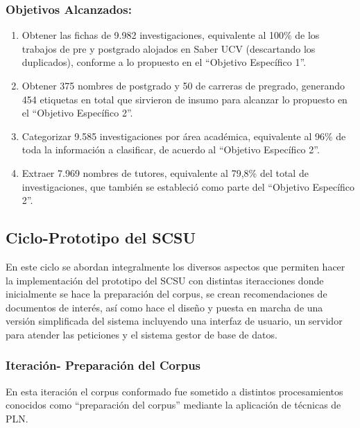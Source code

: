 \documentclass[
  12pt,
  openany]{book}
\begin{document}
\hypertarget{objetivos-alcanzados}{%
\subsubsection{Objetivos Alcanzados:}\label{objetivos-alcanzados}}

\begin{enumerate}
\def\labelenumi{\arabic{enumi}.}
\item
  Obtener las fichas de 9.982 investigaciones, equivalente al 100\% de los trabajos de pre y postgrado alojados en Saber UCV (descartando los duplicados), conforme a lo propuesto en el ``Objetivo Específico 1''.
\item
  Obtener 375 nombres de postgrado y 50 de carreras de pregrado, generando 454 etiquetas en total que sirvieron de insumo para alcanzar lo propuesto en el ``Objetivo Específico 2''.
\item
  Categorizar 9.585 investigaciones por área académica, equivalente al 96\% de toda la información a clasificar, de acuerdo al ``Objetivo Específico 2''.
\item
  Extraer 7.969 nombres de tutores, equivalente al 79,8\% del total de investigaciones, que también se estableció como parte del ``Objetivo Específico 2''.
\end{enumerate}

\newpage

\hypertarget{desarrollociclos3}{%
\subsection{Ciclo-Prototipo del SCSU}\label{desarrollociclos3}}

En este ciclo se abordan integralmente los diversos aspectos que permiten hacer la implementación del prototipo del SCSU con distintas iteracciones donde inicialmente se hace la preparación del corpus, se crean recomendaciones de documentos de interés, así como hace el diseño y puesta en marcha de una versión simplificada del sistema incluyendo una interfaz de usuario, un servidor para atender las peticiones y el sistema gestor de base de datos.

\hypertarget{iternlp}{%
\subsubsection{Iteración- Preparación del Corpus}\label{iternlp}}

En esta iteración el corpus conformado fue sometido a distintos procesamientos conocidos como ``preparación del corpus'' mediante la aplicación de técnicas de PLN.
\end{document}
